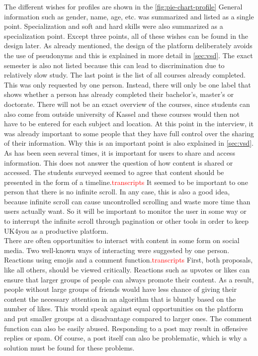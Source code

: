 The different wishes for profiles are shown in the \autoref{fig:pie-chart-profile}
General information such as gender, name, age, etc. was summarized and listed as a single point.
Specialization and soft and hard skills were also summarized as a specialization point.
Except three points, all of these wishes can be found in the design later.
As already mentioned, the design of the platform deliberately avoids the use of pseudonyms and this is explained in more detail in \autoref{sec:vsd}.
The exact semester is also not listed because this can lead to discrimination due to relatively slow study.
The last point is the list of all courses already completed.
This was only requested by one person.
Instead, there will only be one label that shows whether a person has already completed their bachelor's, master's or doctorate.
There will not be an exact overview of the courses, since students can also come from outside university of Kassel and these courses would then not have to be entered for each subject and location.
At this point in the interview, it was already important to some people that they have full control over the sharing of their information.
Why this is an important point is also explained in \autoref{sec:vsd}.\\

As has been seen several times, it is important for users to share and access information.
This does not answer the question of how content is shared or accessed.
The students surveyed seemed to agree that content should be presented in the form of a timeline.\textcolor{red}{transcripts}
It seemed to be important to one person that there is no infinite scroll.
In any case, this is also a good idea, because infinite scroll can cause uncontrolled scrolling and waste more time than users actually want\cite{infinite-scroll-effect}.
So it will be important to monitor the user in some way or to interrupt the infinite scroll through pagination or other tools in order to keep UK4you as a productive platform.\\

There are often opportunities to interact with content in some form on social media.
Two well-known ways of interacting were suggested by one person.
Reactions using emojis and a comment function.\textcolor{red}{transcripts}
First, both proposals, like all others, should be viewed critically.
Reactions such as upvotes or likes can ensure that larger groups of people can always promote their content.
As a result, people without large groups of friends would have less chance of giving their content the necessary attention in an algorithm that is bluntly based on the number of likes.
This would speak against equal opportunities on the platform and put smaller groups at a disadvantage compared to larger ones.
The comment function can also be easily abused.
Responding to a post may result in offensive replies or spam.
Of course, a post itself can also be problematic, which is why a solution must be found for these problems.\\

